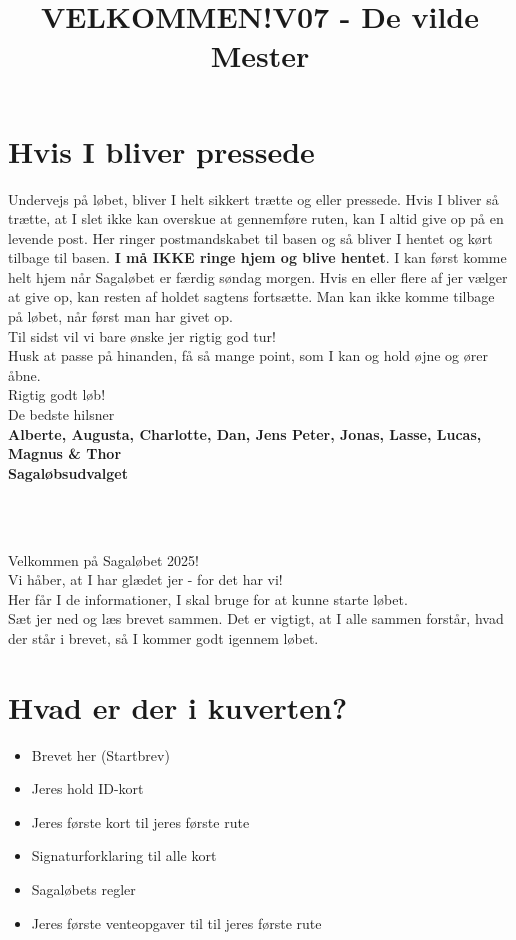 \section{Hvis I bliver pressede}
Undervejs på løbet, bliver I helt sikkert trætte og eller pressede. Hvis I bliver så trætte, at I slet ikke kan overskue at gennemføre ruten, kan I altid give op på en levende post. Her ringer postmandskabet til basen og så bliver I hentet og kørt tilbage til basen. \textbf{I må IKKE ringe hjem og blive hentet}. I kan først komme helt hjem når Sagaløbet er færdig søndag morgen. Hvis en eller flere af jer vælger at give op, kan resten af holdet sagtens fortsætte. Man kan ikke komme tilbage på løbet, når først man har givet op.\\
\newline
Til sidst vil vi bare ønske jer rigtig god tur!\\
Husk at passe på hinanden, få så mange point, som I kan og hold øjne og ører åbne.\\
\newline
Rigtig godt løb!\\
\newline
\textcolor{søblå}{De bedste hilsner}\\
\textcolor{natblå}{\textbf{Alberte, Augusta, Charlotte, Dan, Jens Peter, Jonas, Lasse, Lucas, Magnus \& Thor}}\\
\textcolor{natblå}{\textbf{Sagaløbsudvalget}}\\
\newpage
\title{VELKOMMEN!}\\
\newline
\title{\textcolor{søblå}{V07 - De vilde Mester }}\\
\newline
Velkommen på Sagaløbet 2025!\\
Vi håber, at I har glædet jer - for det har vi!\\
Her får I de informationer, I skal bruge for at kunne starte løbet.\\
Sæt jer ned og læs brevet sammen. Det er vigtigt, at I alle sammen forstår, hvad der står i brevet, så I kommer godt igennem løbet.
\section{Hvad er der i kuverten?}
\begin{itemize}
    \item Brevet her (Startbrev)
    \item Jeres hold ID-kort
    \item Jeres første kort til jeres første rute
    \item Signaturforklaring til alle kort
    \item Sagaløbets regler
    \item Jeres første venteopgaver til til jeres første rute
\end{itemize}
